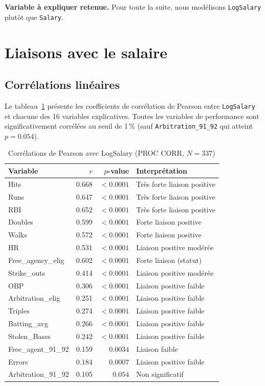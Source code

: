 \documentclass[11pt,a4paper]{article}
\begin{document}
\noindent\textbf{Variable à expliquer retenue.} Pour toute la suite, nous modélisons
\texttt{LogSalary} plutôt que \texttt{Salary}.

\section{Liaisons avec le salaire}

\subsection{Corrélations linéaires}

Le tableau~\ref{tab:corr} présente les coefficients de corrélation de Pearson entre
\texttt{LogSalary} et chacune des 16 variables explicatives. Toutes les variables de
performance sont significativement corrélées au seuil de 1\,\% (sauf \texttt{Arbitration\_91\_92}
qui atteint $p = 0.054$).

\begin{table}[H]
\centering
\caption{Corrélations de Pearson avec LogSalary (PROC CORR, $N = 337$)}
\label{tab:corr}
\small
\begin{tabular}{lrrl}
\toprule
\textbf{Variable} & \textbf{$r$} & \textbf{$p$-value} & \textbf{Interprétation} \\
\midrule
Hits              & 0.668 & $<0.0001$ & Très forte liaison positive \\
Runs              & 0.647 & $<0.0001$ & Très forte liaison positive \\
RBI               & 0.652 & $<0.0001$ & Très forte liaison positive \\
Doubles           & 0.599 & $<0.0001$ & Forte liaison positive \\
Walks             & 0.572 & $<0.0001$ & Forte liaison positive \\
HR                & 0.531 & $<0.0001$ & Liaison positive modérée \\
Free\_agency\_elig & 0.602 & $<0.0001$ & Forte liaison (statut) \\
Strike\_outs      & 0.414 & $<0.0001$ & Liaison positive modérée \\
OBP               & 0.306 & $<0.0001$ & Liaison positive faible \\
Arbitration\_elig & 0.251 & $<0.0001$ & Liaison positive faible \\
Triples           & 0.274 & $<0.0001$ & Liaison positive faible \\
Batting\_avg      & 0.266 & $<0.0001$ & Liaison positive faible \\
Stolen\_Bases     & 0.242 & $<0.0001$ & Liaison positive faible \\
Free\_agent\_91\_92 & 0.159 & $0.0034$  & Liaison faible \\
Errors            & 0.184 & $0.0007$  & Liaison positive faible \\
Arbitration\_91\_92 & 0.105 & $0.054$   & Non significatif \\
\bottomrule
\end{tabular}
\end{table}
\end{document}
